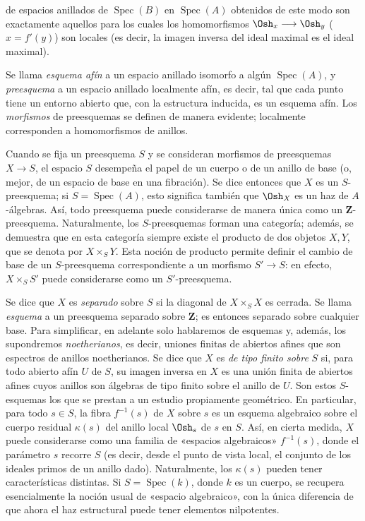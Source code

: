 de espacios anillados de $\operatorname{Spec}(B)$ en
$\operatorname{Spec}(A)$ obtenidos de este modo son exactamente aquellos para
los cuales los homomorfismos $\Osh_x\longrightarrow\Osh_y$ ($x=f'(y)$) son
locales (es decir, la imagen inversa del ideal maximal es el ideal maximal).

Se llama \emph{esquema afín} a un espacio anillado isomorfo a algún
$\operatorname{Spec}(A)$, y \emph{preesquema} a un espacio anillado localmente
afín, es decir, tal que cada punto tiene un entorno abierto que, con la
estructura inducida, es un esquema afín. Los \emph{morfismos} de preesquemas se
definen de manera evidente; localmente corresponden a homomorfismos de anillos.

Cuando se fija un preesquema $S$ y se consideran morfismos de preesquemas
$X\longrightarrow S$, el espacio $S$ desempeña el papel de un cuerpo o de un
anillo de base (o, mejor, de un espacio de base en una fibración). Se dice
entonces que $X$ es un $S$-preesquema; si $S=\operatorname{Spec}(A)$, esto
significa también que $\Osh_X$ es un haz de $A$-álgebras. Así, todo preesquema
puede considerarse de manera única como un $\mathbf Z$-preesquema. Naturalmente,
los $S$-preesquemas forman una categoría; además, se demuestra que en esta
categoría siempre existe el producto de dos objetos $X,Y$, que se denota por
$X\times_S Y$. Esta noción de producto permite definir el cambio de base de un
$S$-preesquema correspondiente a un morfismo $S'\longrightarrow S$: en efecto,
$X\times_S S'$ puede considerarse como un $S'$-preesquema.

Se dice que $X$ es \emph{separado} sobre $S$ si la diagonal de
$X\times_S X$ es cerrada. Se llama \emph{esquema} a un preesquema separado
sobre $\mathbf Z$; es entonces separado sobre cualquier base. Para simplificar,
en adelante solo hablaremos de esquemas y, además, los supondremos
\emph{noetherianos}, es decir, uniones finitas de abiertos afines que son
espectros de anillos noetherianos. Se dice que $X$ es \emph{de tipo finito
sobre} $S$ si, para todo abierto afín $U$ de $S$, su imagen inversa en $X$ es
una unión finita de abiertos afines cuyos anillos son álgebras de tipo finito
sobre el anillo de $U$. Son estos $S$-esquemas los que se prestan a un estudio
propiamente geométrico. En particular, para todo $s\in S$, la fibra
$f^{-1}(s)$ de $X$ sobre $s$ es un esquema algebraico sobre el cuerpo residual
$\kappa(s)$ del anillo local $\Osh_s$ de $s$ en $S$. Así, en cierta medida, $X$
puede considerarse como una familia de «espacios algebraicos» $f^{-1}(s)$, donde
el parámetro $s$ recorre $S$ (es decir, desde el punto de vista local, el
conjunto de los ideales primos de un anillo dado). Naturalmente, los
$\kappa(s)$ pueden tener características distintas. Si
$S=\operatorname{Spec}(k)$, donde $k$ es un cuerpo, se recupera esencialmente la
noción usual de «espacio algebraico», con la única diferencia de que ahora el
haz estructural puede tener elementos nilpotentes.

